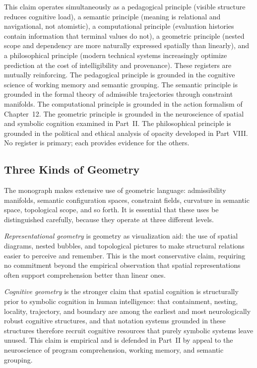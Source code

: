 \documentclass[12pt,openany]{book}
\theoremstyle{plain}
\theoremstyle{definition}
\theoremstyle{remark}
\begin{document}
This claim operates simultaneously as a pedagogical principle (visible structure reduces cognitive load), a semantic principle (meaning is relational and navigational, not atomistic), a computational principle (evaluation histories contain information that terminal values do not), a geometric principle (nested scope and dependency are more naturally expressed spatially than linearly), and a philosophical principle (modern technical systems increasingly optimize prediction at the cost of intelligibility and provenance). These registers are mutually reinforcing. The pedagogical principle is grounded in the cognitive science of working memory and semantic grouping. The semantic principle is grounded in the formal theory of admissible trajectories through constraint manifolds. The computational principle is grounded in the action formalism of Chapter~12. The geometric principle is grounded in the neuroscience of spatial and symbolic cognition examined in Part~II. The philosophical principle is grounded in the political and ethical analysis of opacity developed in Part~VIII. No register is primary; each provides evidence for the others.

\subsection*{Three Kinds of Geometry}

The monograph makes extensive use of geometric language: admissibility manifolds, semantic configuration spaces, constraint fields, curvature in semantic space, topological scope, and so forth. It is essential that these uses be distinguished carefully, because they operate at three different levels.

\emph{Representational geometry} is geometry as visualization aid: the use of spatial diagrams, nested bubbles, and topological pictures to make structural relations easier to perceive and remember. This is the most conservative claim, requiring no commitment beyond the empirical observation that spatial representations often support comprehension better than linear ones.

\emph{Cognitive geometry} is the stronger claim that spatial cognition is structurally prior to symbolic cognition in human intelligence: that containment, nesting, locality, trajectory, and boundary are among the earliest and most neurologically robust cognitive structures, and that notation systems grounded in these structures therefore recruit cognitive resources that purely symbolic systems leave unused. This claim is empirical and is defended in Part~II by appeal to the neuroscience of program comprehension, working memory, and semantic grouping.
\end{document}
